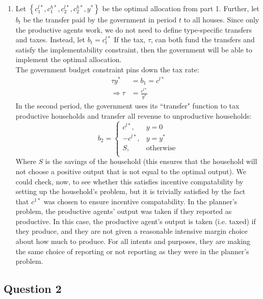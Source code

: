 \documentclass{article}
\begin{document}
\begin{enumerate}
	\item Let ${\left\{c_1^{l*},c_1^{h*},c_2^{l*},c_2^{h*},y^*\right\}}$ be the optimal allocation from part 1. Further, let $b_t$ be the transfer paid by the government in period $t$ to all houses. Since only the productive agents work, we do not need to define type-specific transfers and taxes. Instead, let ${b_t=c_t^{l*}}$ If the tax, $\tau$, can both fund the transfers and satisfy the implementability constraint, then the government will be able to implement the optimal allocation.
	\medskip \\
	The government budget constraint pins down the tax rate:
	\begin{align*}
				\tau y^* &= b_1 = c^{l*}		\\
		\Rightarrow \tau &= \frac{c^{l*}}{y^*}
	\end{align*}
	In the second period, the government uses its ``transfer" function to tax productive households and transfer all revenue to unproductive households:
	\[
		b_2 =	\begin{cases}
					c^{l*},		& y=0					\\
					-c^{l*}, 	& y= y^*				\\
					S, 			& \text{otherwise}		\\
				\end{cases}
	\]
	Where $S$ is the savings of the household (this ensures that the household will not choose a positive output that is not equal to the optimal output). We could check, now, to see whether this satisfies incentive compatability by setting up the household's problem, but it is trivially satisfied by the fact that $c^{1*}$ was chosen to ensure incentive compatability. In the planner's problem, the productive agents' output was taken if they reported as productive. In this case, the productive agent's output is taken (i.e. taxed) if they produce, and they are not given a reasonable intensive margin choice about how much to produce. For all intents and purposes, they are making the same choice of reporting or not reporting as they were in the planner's problem.
	
	\end{enumerate}


\pagebreak
\subsection*{Question 2}
\end{document}
